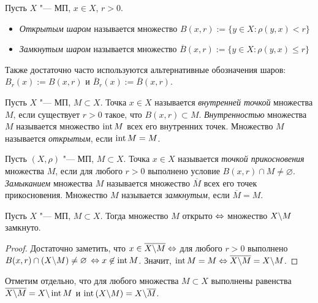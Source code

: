 \begin{definition}
	Пусть $X$ "--- МП, $x \in X$, $r > 0$.
	\begin{itemize}
		\item \textit{Открытым шаром} называется множество $B(x, r) := \{y \in X: \rho(y, x) < r\}$
		
		\item \textit{Замкнутым шаром} называется множество $\overline B(x, r) := \{y \in X: \rho(y, x) \leqslant r\}$
	\end{itemize}
\end{definition}
\begin{note}
Также достаточно часто используются альтернативные обозначения шаров: \(B_r(x):=B(x, r)\) и \(\overline B_r(x):= \overline B(x, r)\).
\end{note}

\begin{definition}
	Пусть $X$ "--- МП, $M \subset X$. Точка $x \in X$ называется \textit{внутренней точкой} множества $M$, если существует $r > 0$ такое, что $B(x, r) \subset M$. \textit{Внутренностью} множества $M$ называется множество $\operatorname{int}{M}$ всех его внутренних точек. Множество $M$ называется \textit{открытым}, если $\operatorname{int}{M} = M$.
\end{definition}

\begin{definition}
	Пусть $(X, \rho)$ "--- МП, $M \subset X$. Точка $x \in X$ назы\-вается \textit{точкой прикосновения} множества $M$, если для любого $r > 0$ выполнено условие $B(x, r) \cap M \neq \varnothing$. \textit{Замыканием} множества $M$ называется множество $\overline M$ всех его точек прикосновения. Множество $M$ называется \textit{замкнутым}, если $\overline M = M$.
\end{definition}

\begin{theorem}\label{thm1.1}
	Пусть $X$ "--- МП, $M \subset X$. Тогда множество $M$ открыто $\Leftrightarrow$ множество $X \backslash M$ замкнуто.
\end{theorem}

\begin{proof}
	Достаточно заметить, что $x \in \overline{X \backslash M} \Leftrightarrow$ для любого $r > 0$ выполнено $B(x, r) \cap (X \backslash M) \neq \varnothing$ $\Leftrightarrow x \not\in \operatorname{int}{M}$. Значит, $\operatorname{int} M = M\Leftrightarrow \overline{X \backslash M} = X \backslash M$.
\end{proof}

\begin{note}
	Отметим отдельно, что для любого множества $M \subset X$ выполнены равенства $\overline{X \backslash M} = X \backslash \operatorname{int} M$ и $\operatorname{int}{(X \backslash M)} = X \backslash \overline M$.
\end{note}

